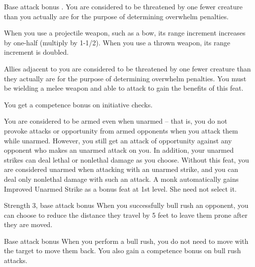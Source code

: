  Base attack bonus .
 You are considered to be threatened by one fewer creature than you actually are for the purpose of determining overwhelm penalties.

 When you use a projectile weapon, such as a bow, its range increment increases by one-half (multiply by 1-1/2). When you use a thrown weapon, its range increment is doubled.


 Allies adjacent to you are considered to be threatened by one fewer creature than they actually are for the purpose of determining overwhelm penalties. You must be wielding a melee weapon and able to attack to gain the benefits of this feat.

 You get a  competence bonus on initiative checks.

 You are considered to be armed even when unarmed -- that is, you do not provoke attacks or opportunity from armed opponents when you attack them while unarmed. However, you still get an attack of opportunity against any opponent who makes an unarmed attack on you.
In addition, your unarmed strikes can deal lethal or nonlethal damage as you choose.
 Without this feat, you are considered unarmed when attacking with an unarmed strike, and you can deal only nonlethal damage with such an attack.
 A monk automatically gains Improved Unarmed Strike as a bonus feat at 1st level. She need not select it.

\featpres Strength 3, base attack bonus 
\featben When you successfully bull rush an opponent, you can choose to reduce the distance they travel by 5 feet to leave them prone after they are moved.

 Base attack bonus 
 When you perform a bull rush, you do not need to move with the target to move them back. You also gain a  competence bonus on bull rush attacks.

